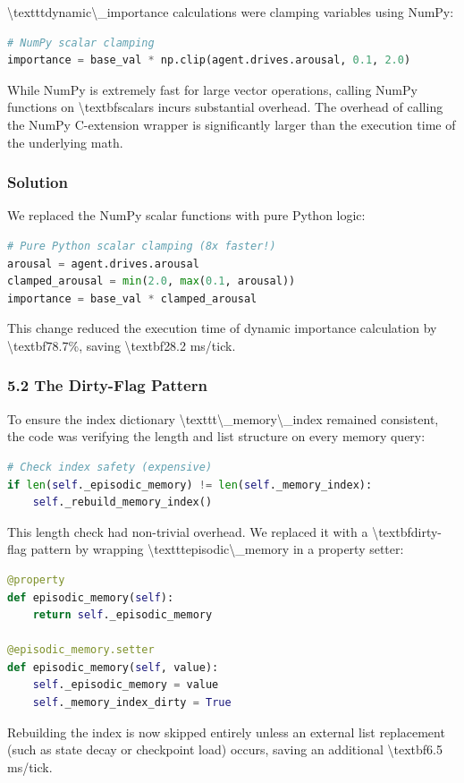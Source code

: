 \documentclass[11pt,a4paper]{article}
\begin{document}
\textbackslash{}texttt{dynamic\textbackslash{}\_importance} calculations were clamping variables using NumPy:
\begin{lstlisting}[language=python]
# NumPy scalar clamping
importance = base_val * np.clip(agent.drives.arousal, 0.1, 2.0)
\end{lstlisting}
While NumPy is extremely fast for large vector operations, calling NumPy functions on \textbackslash{}textbf{scalars} incurs substantial overhead. The overhead of calling the NumPy C-extension wrapper is significantly larger than the execution time of the underlying math.

\subsubsection*{Solution}
We replaced the NumPy scalar functions with pure Python logic:
\begin{lstlisting}[language=python]
# Pure Python scalar clamping (8x faster!)
arousal = agent.drives.arousal
clamped_arousal = min(2.0, max(0.1, arousal))
importance = base_val * clamped_arousal
\end{lstlisting}
This change reduced the execution time of dynamic importance calculation by \textbackslash{}textbf{78.7\%}, saving \textbackslash{}textbf{28.2 ms/tick}.

\subsubsection*{5.2 The Dirty-Flag Pattern}
To ensure the index dictionary \textbackslash{}texttt{\textbackslash{}\_memory\textbackslash{}\_index} remained consistent, the code was verifying the length and list structure on every memory query:
\begin{lstlisting}[language=python]
# Check index safety (expensive)
if len(self._episodic_memory) != len(self._memory_index):
    self._rebuild_memory_index()
\end{lstlisting}
This length check had non-trivial overhead. We replaced it with a \textbackslash{}textbf{dirty-flag pattern} by wrapping \textbackslash{}texttt{episodic\textbackslash{}\_memory} in a property setter:
\begin{lstlisting}[language=python]
@property
def episodic_memory(self):
    return self._episodic_memory

@episodic_memory.setter
def episodic_memory(self, value):
    self._episodic_memory = value
    self._memory_index_dirty = True
\end{lstlisting}
Rebuilding the index is now skipped entirely unless an external list replacement (such as state decay or checkpoint load) occurs, saving an additional \textbackslash{}textbf{6.5 ms/tick}.
\end{document}
